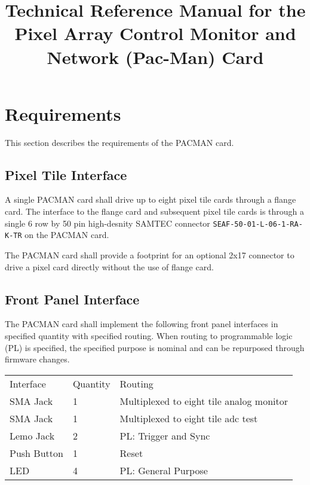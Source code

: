 \documentclass[12pt]{article}
\begin{document}

\title{Technical Reference Manual for the Pixel Array Control Monitor and Network (Pac-Man) Card}

\maketitle

\section{Requirements}

This section describes the requirements of the PACMAN card.


\subsection{Pixel Tile Interface}

A single PACMAN card shall drive up to eight pixel tile cards through a
flange card.  The interface to the flange card and subsequent pixel
tile cards is through a single 6 row by 50 pin high-desnity SAMTEC
connector {\tt SEAF-50-01-L-06-1-RA-K-TR} on the PACMAN card.

The PACMAN card shall provide a footprint for an optional 2x17
connector to drive a pixel card directly without the use of flange
card.

\subsection{Front Panel Interface}

The PACMAN card shall implement the following front panel interfaces in
specified quantity with specified routing.  When routing to
programmable logic (PL) is specified, the specified purpose is nominal
and can be repurposed through firmware changes.

\begin{center}
\begin{tabular}{lll}
Interface   & Quantity & Routing \\
SMA Jack    & 1 & Multiplexed to eight tile analog monitor \\
SMA Jack    & 1 & Multiplexed to eight tile adc test \\
Lemo Jack   & 2 & PL: Trigger and Sync \\
Push Button & 1 & Reset \\
LED         & 4 & PL: General Purpose
\end{tabular}
\end{center}
\end{document}
